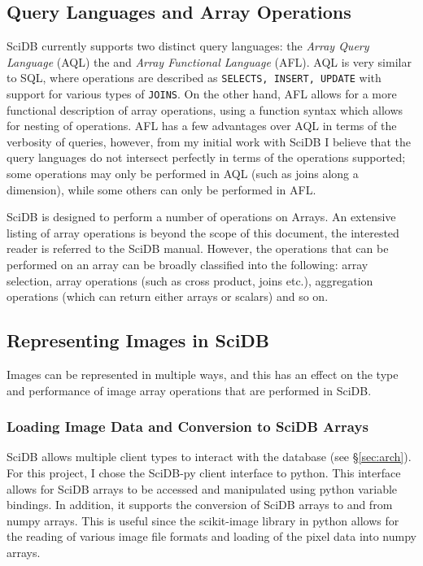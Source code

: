 \documentclass[letterpaper,twocolumn,10pt]{article}
\begin{document}
\subsection{Query Languages and Array Operations}
SciDB currently supports two distinct query languages: the {\em Array Query Language} (AQL) the and {\em Array Functional Language} (AFL). AQL is very similar to SQL, where operations are described as \texttt {SELECTS, INSERT, UPDATE} with support for various types of \texttt{JOINS}. On the other hand, AFL allows for a more functional description of array operations, using a function syntax which allows for nesting of operations. AFL has a few advantages over AQL in terms of the verbosity of queries, however, from my initial work with SciDB I believe that the query languages do not intersect perfectly in terms of the operations supported; some operations may only be performed in AQL (such as joins along a dimension), while some others can only be performed in AFL. 

SciDB is designed to perform a number of operations on Arrays. An extensive listing of array operations is beyond the scope of this document, the interested reader is referred to the SciDB manual\cite{SciDBManual}. However, the operations that can be performed on an array can be broadly classified into the following: array selection, array operations (such as cross product, joins etc.), aggregation operations (which can return either arrays or scalars) and so on.

\subsection{Representing Images in SciDB}\label{sec:images}
Images can be represented in multiple ways, and this has an effect on the type and performance of image array operations that are performed in SciDB.

\subsubsection{Loading Image Data and Conversion to SciDB Arrays}
SciDB allows multiple client types to interact with the database (see \S\ref{sec:arch}).  For this project, I chose the SciDB-py client interface to python\cite{SciDBPy}. This interface allows for SciDB arrays to be accessed and manipulated using python variable bindings. In addition, it supports the conversion of SciDB arrays to and from numpy arrays. This is useful since the scikit-image library\cite{van2014scikit} in python allows for the reading of various image file formats and loading of the pixel data into numpy arrays. 
\end{document}
